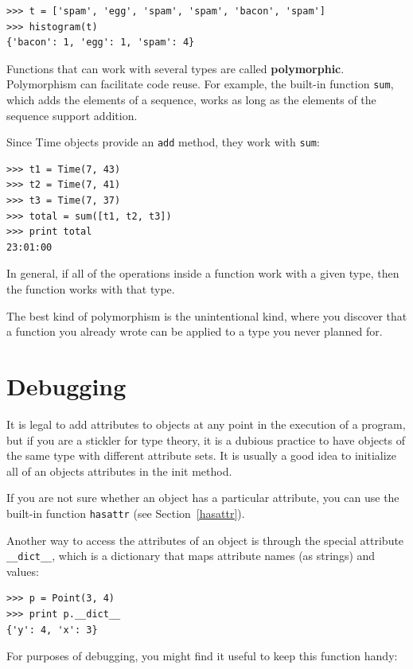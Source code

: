 \documentclass[10pt]{book}
\begin{document}
\begin{verbatim}
>>> t = ['spam', 'egg', 'spam', 'spam', 'bacon', 'spam']
>>> histogram(t)
{'bacon': 1, 'egg': 1, 'spam': 4}
\end{verbatim}
%
Functions that can work with several types are called {\bf polymorphic}.
Polymorphism can facilitate code reuse.  For example, the built-in
function {\tt sum}, which adds the elements of a sequence, works
as long as the elements of the sequence support addition.

Since Time objects provide an {\tt add} method, they work
with {\tt sum}:

\begin{verbatim}
>>> t1 = Time(7, 43)
>>> t2 = Time(7, 41)
>>> t3 = Time(7, 37)
>>> total = sum([t1, t2, t3])
>>> print total
23:01:00
\end{verbatim}
%
In general, if all of the operations inside a function
work with a given type, then the function works with that type.

The best kind of polymorphism is the unintentional kind, where
you discover that a function you already wrote can be
applied to a type you never planned for.


\section{Debugging}

It is legal to add attributes to objects at any point in the execution
of a program, but if you are a stickler for type theory, it is a
dubious practice to have objects of the same type with different
attribute sets.  It is usually a good idea to
initialize all of an objects attributes in the init method.

If you are not sure whether an object has a particular attribute, you
can use the built-in function {\tt hasattr} (see Section~\ref{hasattr}).

Another way to access the attributes of an object is through the
special attribute \verb"__dict__", which is a dictionary that maps
attribute names (as strings) and values:

\begin{verbatim}
>>> p = Point(3, 4)
>>> print p.__dict__
{'y': 4, 'x': 3}
\end{verbatim}
%
For purposes of debugging, you might find it useful to keep this
function handy:
\end{document}
